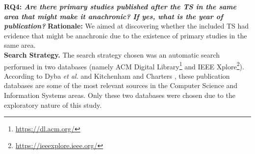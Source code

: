 \documentclass[sigconf]{acmart}
\begin{document}
\textbf{RQ4: \textit{Are there primary studies published after the TS in the same area that might make it anachronic? If yes, what is the year of publication?}} \textbf{Rationale:} We aimed at discovering whether the included TS had evidence that might be anachronic due to the existence of primary studies in the same area.
\\







\vspace{-0.2cm}
\textbf{Search  Strategy.} The search strategy chosen was an automatic search performed in two databases (namely ACM Digital Library\footnote{\url{https://dl.acm.org/}} and IEEE Xplore\footnote{\url{https://ieeexplore.ieee.org/}}). According to Dyba \textit{et al.} \cite{petersen2015guidelines} and Kitchenham and Charters \cite{Kitchenham2007}, these publication databases are some of the most relevant sources in the Computer Science and Information Systems areas. Only these two databases were chosen due to the exploratory nature of this study.
\end{document}
